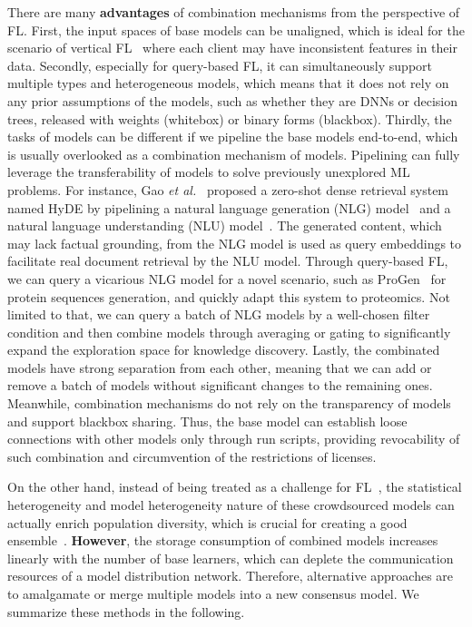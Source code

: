 There are many \textbf{advantages} of combination mechanisms from the perspective of FL.
First, the input spaces of base models can be unaligned, which is ideal for the scenario of vertical FL~\cite{wu2022practical} where each client may have inconsistent features in their data.
Secondly, especially for query-based FL, it can simultaneously support multiple types and heterogeneous models, which means that it does not rely on any prior assumptions of the models, such as whether they are DNNs or decision trees, released with weights (whitebox) or binary forms (blackbox).
Thirdly, the tasks of models can be different if we pipeline the base models end-to-end, which is usually overlooked as a combination mechanism of models. 
Pipelining can fully leverage the transferability of models to solve previously unexplored ML problems.
For instance, Gao \textit{et al.}~\cite{gao2022precise} proposed a zero-shot dense retrieval system named HyDE by pipelining a natural language generation (NLG) model~\cite{ouyang2022training} and a natural language understanding (NLU) model~\cite{izacard2021towards}.
The generated content, which may lack factual grounding, from the NLG model is used as query embeddings to facilitate real document retrieval by the NLU model.
Through query-based FL, we can query a vicarious NLG model for a novel scenario, such as ProGen~\cite{madani2023large} for protein sequences generation, and quickly adapt this system to proteomics.
Not limited to that, we can query a batch of NLG models by a well-chosen filter condition and then combine models through averaging or gating to significantly expand the exploration space for knowledge discovery.
Lastly, the combinated models have strong separation from each other, meaning that we can add or remove a batch of models without significant changes to the remaining ones.
Meanwhile, combination mechanisms do not rely on the transparency of models and support blackbox sharing. 
Thus, the base model can establish loose connections with other models only through run scripts, providing revocability of such combination and circumvention of the restrictions of licenses.

On the other hand, instead of being treated as a challenge for FL~\cite{ma2022state}, the statistical heterogeneity and model heterogeneity nature of these crowdsourced models can actually enrich population diversity, which is crucial for creating a good ensemble~\cite{maclin1995combining, opitz1995generating}. 
\textbf{However}, the storage consumption of combined models increases linearly with the number of base learners, which can deplete the communication resources of a model distribution network. 
Therefore, alternative approaches are to amalgamate or merge multiple models into a new consensus model. We summarize these methods in the following.

